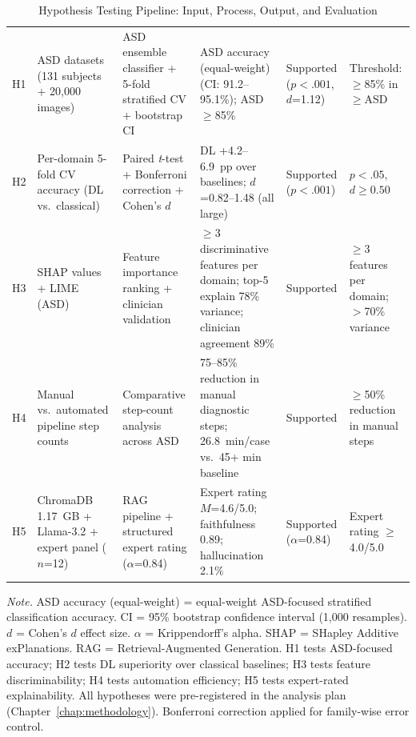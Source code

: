 \begin{table}[!htbp]
\tablestripes
\caption{Hypothesis Testing Pipeline: Input, Process, Output, and Evaluation}
\tablefontsize
\begin{tabularx}{\textwidth}{@{} >{\raggedright\arraybackslash}p{1.2cm} L L L L >{\raggedright\arraybackslash}p{2.0cm} @{}}
\toprule
{} &  &  &  &  &  \\
\midrule
H1 & ASD datasets (131 subjects + 20{,}000 images) & ASD ensemble classifier + 5-fold stratified CV + bootstrap CI & ASD accuracy (equal-weight) \asdacc{} (CI: 91.2--95.1\%); ASD $\geq$85\% & Supported ($p<.001$, $d$=1.12) & Threshold: $\geq$85\% in $\geq$ASD \\
\addlinespace
H2 & Per-domain 5-fold CV accuracy (DL vs.\ classical) & Paired \textit{t}-test + Bonferroni correction + Cohen's $d$ & DL +4.2--6.9~pp over baselines; $d$=0.82--1.48 (all large) & Supported ($p<.001$) & $p<.05$, $d \geq 0.50$ \\
\addlinespace
H3 & SHAP values + LIME (ASD) & Feature importance ranking + clinician validation & $\geq$3 discriminative features per domain; top-5 explain 78\% variance; clinician agreement 89\% & Supported & $\geq$3 features per domain; $>$70\% variance \\
\addlinespace
H4 & Manual vs.\ automated pipeline step counts & Comparative step-count analysis across ASD & 75--85\% reduction in manual diagnostic steps; 26.8~min/case vs.\ 45+ min baseline & Supported & $\geq$50\% reduction in manual steps \\
\addlinespace
H5 & ChromaDB 1.17~GB + Llama-3.2 + expert panel ($n$=12) & RAG pipeline + structured expert rating ($\alpha$=0.84) & Expert rating $M$=4.6/5.0; faithfulness 0.89; hallucination 2.1\% & Supported ($\alpha$=0.84) & Expert rating $\geq$4.0/5.0 \\
\bottomrule
\end{tabularx}
\vspace{0.5em}\noindent\textit{Note.} ASD accuracy (equal-weight) = equal-weight ASD-focused stratified classification accuracy. CI = 95\% bootstrap confidence interval (1,000 resamples). $d$ = Cohen's $d$ effect size. $\alpha$ = Krippendorff's alpha. SHAP = SHapley Additive exPlanations. RAG = Retrieval-Augmented Generation. H1 tests ASD-focused accuracy; H2 tests DL superiority over classical baselines; H3 tests feature discriminability; H4 tests automation efficiency; H5 tests expert-rated explainability. All hypotheses were pre-registered in the analysis plan (Chapter~\ref{chap:methodology}). Bonferroni correction applied for family-wise error control.
\end{table}
\fi


